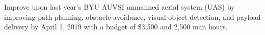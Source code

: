 

Improve upon last year's BYU AUVSI unmanned aerial system (UAS) by improving path planning,
obstacle avoidance, visual object detection, and payload delivery by April 1, 2019 with a budget
of \$3,500 and 2,500 man hours.
